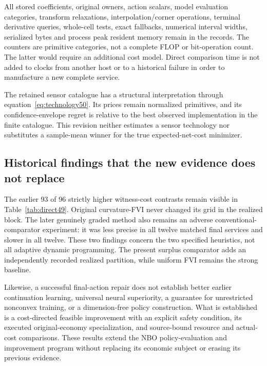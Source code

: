 
All stored coefficients, original owners, action scalars, model evaluation categories, transform relaxations, interpolation/corner operations, terminal derivative queries, whole-cell tests, exact fallbacks, numerical interval widths, serialized bytes and process peak resident memory remain in the records. The counters are primitive categories, not a complete FLOP or bit-operation count. The latter would require an additional cost model. Direct comparison time is not added to clocks from another host or to a historical failure in order to manufacture a new complete service.

The retained sensor catalogue has a structural interpretation through equation~\eqref{eq:technology50}. Its prices remain normalized primitives, and its confidence-envelope regret is relative to the best observed implementation in the finite catalogue. This revision neither estimates a sensor technology nor substitutes a sample-mean winner for the true expected-net-cost minimizer.

\subsection{Historical findings that the new evidence does not replace}
The earlier 93 of 96 strictly higher witness-cost contrasts remain visible in Table~\ref{tab:direct49}. Original curvature-FVI never changed its grid in the realized block. The later genuinely graded method also remains an adverse conventional-comparator experiment: it was less precise in all twelve matched final services and slower in all twelve. These two findings concern the two specified heuristics, not all adaptive dynamic programming. The present surplus comparator adds an independently recorded realized partition, while uniform FVI remains the strong baseline.

Likewise, a successful final-action repair does not establish better earlier continuation learning, universal neural superiority, a guarantee for unrestricted nonconvex training, or a dimension-free policy construction. What is established is a cost-directed feasible improvement with an explicit safety condition, its executed original-economy specialization, and source-bound resource and actual-cost comparisons. These results extend the NBO policy-evaluation and improvement program without replacing its economic subject or erasing its previous evidence.
